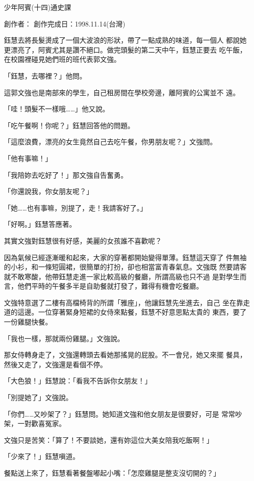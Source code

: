 



少年阿賓(十四)通史課

創作者：
創作完成日：1998.11.14(台灣)


鈺慧去將長髮燙成了一個大波浪的形狀，帶了一點成熟的味道，每一個人
都說她更漂亮了，阿賓尤其是讚不絕口。做完頭髮的第二天中午，鈺慧正要去
吃午飯，在校園裡碰見她們班的班代表郭文強。

「鈺慧，去哪裡？」他問。

這郭文強也是南部來的學生，自己租房間在學校旁邊，離阿賓的公寓並不
遠。

「哇！頭髮不一樣哦……」他又說。

「吃午餐啊！你呢？」鈺慧回答他的問題。

「這麼浪費，漂亮的女生竟然自己去吃午餐，你男朋友呢？」文強問。

「他有事嘛！」

「我陪妳去吃好了！」那文強自告奮勇。

「你還說我，你女朋友呢？」

「她……也有事嘛，別提了，走！我請客好了。」

「好啊。」鈺慧答應著。

其實文強對鈺慧很有好感，美麗的女孩誰不喜歡呢？

因為氣候已經逐漸暖和起來，大家的穿著都開始變得單薄。鈺慧這天穿了
件無袖的小衫，和一條短圓裙，很簡單的打扮，卻也相當富青春氣息。文強既
然要請客就不敢寒酸，他帶鈺慧走進一家比較高級的餐廳，所謂高級也只不過
是對學生而言，他們平時的午餐多半是自助餐就打發了，難得有機會吃餐廳。

文強特意選了二樓有高檔椅背的所謂「雅座」，他讓鈺慧先坐進去，自己
坐在靠走道的這邊。一位穿著緊身短裙的女侍來點餐，鈺慧不好意思點太貴的
東西，要了一份雞腿快餐。

「我也一樣，那就兩份雞腿。」文強說。

那女侍轉身走了，文強還轉頭去看她那搖晃的屁股。不一會兒，她又來擺
餐具，然後又走了，文強還是看個不停。

「大色狼！」鈺慧說：「看我不告訴你女朋友！」

「別提她了」文強說。

「你們……又吵架了？」鈺慧問。她知道文強和他女朋友是很要好，可是
常常吵架，一對歡喜冤家。

文強只是苦笑：「算了！不要談她，還有妳這位大美女陪我吃飯啊！」

「少來了！」鈺慧嗔道。

餐點送上來了，鈺慧看著餐盤嘟起小嘴：「怎麼雞腿是整支沒切開的？」

